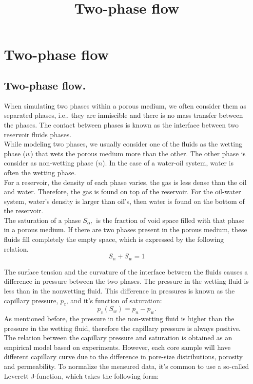 \documentclass[a4paper,10pt]{report}
\title{Two-phase flow}
\author{}
\begin{document}
\chapter{Two-phase flow}
\section{Two-phase flow.}
When simulating two phases within a porous medium, we often consider them as separated phases, i.e.,
they are inmiscible and there is no mass transfer between the phases. 
The contact between phases is known as the interface between two reservoir fluids phases.\\ 
While modeling two phases, we 
usually consider one of the fluids as the wetting phase ($w$) that wets the porous medium more than the other.
The other phase is consider as non-wetting phase ($n$). In the case of a water-oil system, water is often 
the wetting phase. \\
For a reservoir, the density of each phase varies, the gas is less dense than the oil and water. 
Therefore, the gas is found on top of the reservoir. For the oil-water system, water's density is larger 
than oil's, then water is found on the bottom of the reservoir.\\
The saturation of a phase $S_{\alpha},$ is the fraction of void space filled with that phase in a porous 
medium.
If there are two phases present in the porous medium, these fluids fill completely the empty space, which is
expressed by the following relation.
\begin{equation}\label{eq:satrel}
 S_n+S_w=1
\end{equation}

The surface tension and the curvature of the interface between the fluids causes a difference in pressure
between the two phases. 
The pressure in the wetting fluid is less than in the nonwetting fluid. 
This difference in pressures is known as the capillary pressure, $p_c$, and it's function of saturation:
\begin{equation}\label{eq:cappress}
 p_c(S_w)=p_n-p_w.
\end{equation}
As mentioned before, the pressure in the non-wetting fluid is higher than the pressure in the wetting fluid, therefore the 
capillary pressure is always positive. 
The relation between the capillary pressure and saturation is obtained as an empirical model based on experiments. 
However, each core sample will have different capillary curve due to the difference in pore-size distributions,
porosity and permeability.
To normalize the measured data, it's common to use a so-called Leverett J-function, which takes the following form:
\end{document}
